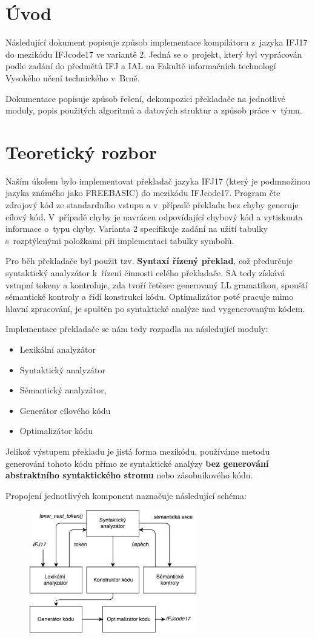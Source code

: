 \section{Úvod}
Následující dokument popisuje způsob implementace kompilátoru z~jazyka IFJ17 do mezikódu
IFJcode17 ve variantě 2. Jedná se o~projekt,
který byl vyprácován podle zadání do předmětů IFJ a IAL na Fakultě
informačních technologí Vysokého učení technického v~Brně.

Dokumentace popisuje způsob řešení, dekompozici překladače na jednotlivé moduly,
popis použitých algoritmů a datových struktur a způsob práce v~týmu.

\section{Teoretický rozbor}
Naším úkolem bylo implementovat překladač jazyka IFJ17 (který je podmnožinou jazyka známého jako \mbox{FREEBASIC})
do mezikódu IFJcode17. Program čte zdrojový kód ze standardního vstupu a v~případě překladu bez chyby generuje cílový
kód. V~případě chyby je navrácen odpovídající chybový kód a vytisknuta informace o~typu chyby. Varianta 2 specifikuje
zadání na užití tabulky s~rozptýlenými položkami při implementaci tabulky symbolů.

Pro běh překladače byl použit tzv. \textbf{Syntaxí řízený překlad}, což předurčuje syntaktický analyzátor k~řízení činnosti
celého překladače. SA tedy získává vstupní tokeny a kontroluje, zda tvoří řetězec generovaný
LL gramatikou, spouští sémantické kontroly a řídí konstrukci kódu.
Optimalizátor poté pracuje mimo hlavní zpracování, je spuštěn po syntaktické analýze nad vygenerovaným kódem.

Implementace překladače se nám tedy rozpadla na následující moduly:
\begin{itemize}
    \item Lexikální analyzátor
    \item Syntaktický analyzátor
    \item Sémantický analyzátor,
    \item Generátor cílového kódu
    \item Optimalizátor kódu
\end{itemize}

Jelikož výstupem překladu je jistá forma mezikódu, používáme metodu generování tohoto kódu přímo ze syntaktické analýzy \textbf{bez generování abstraktního syntaktického stromu} nebo zásobníkového kódu.

Propojení jednotlivých komponent naznačuje následující schéma:
\vspace*{4px}
\begin{figure}[htbp]
	\centering
	\includegraphics[width=0.65\textwidth, angle=0]{src/assets/structure.pdf}
\end{figure}